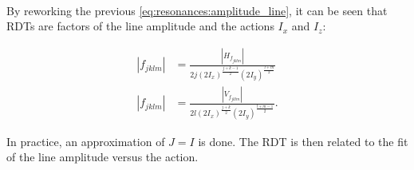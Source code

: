 \paragraph{}

By reworking the previous \cref{eq:resonances:amplitude_line}, it can be seen that RDTs are factors
of the line amplitude and the actions $I_x$ and $I_z$:

\begin{equation}
    \begin{aligned}
    |f_{jklm}| &= \frac{|H_{f_{jklm}}|}{2 j (2 I_x)^\frac{j+k-1}{2} (2 I_y)^\frac{l+m}{2}} \\
    |f_{jklm}| &= \frac{|V_{f_{jklm}}|}{2 l (2 I_x)^\frac{j+k}{2} (2 I_y)^\frac{l+m-1}{2}} .
    \label{eq:resonances:amplitude_rdt}
    \end{aligned}
\end{equation}

In practice, an approximation of $J = I$ is done. The RDT is then related to the fit of the line
amplitude versus the action.%


